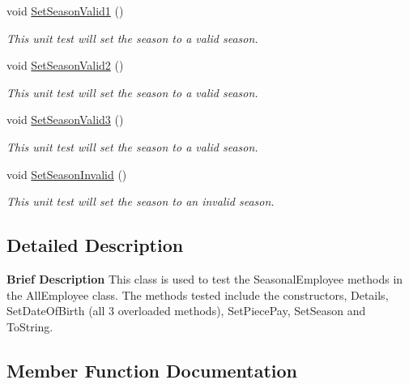 \begin{DoxyCompactItemize}
void \hyperlink{class_my_all_employee_1_1_tests_1_1_seasonal_employee_tests_a72be7ca2a79c9a27833e3551b851a3ff}{Set\+Season\+Valid1} ()
\begin{DoxyCompactList}\small\item\em This unit test will set the season to a valid season. \end{DoxyCompactList}\item 
void \hyperlink{class_my_all_employee_1_1_tests_1_1_seasonal_employee_tests_a425089350805a527c370ea0d0dbc86b8}{Set\+Season\+Valid2} ()
\begin{DoxyCompactList}\small\item\em This unit test will set the season to a valid season. \end{DoxyCompactList}\item 
void \hyperlink{class_my_all_employee_1_1_tests_1_1_seasonal_employee_tests_ac8de2e85a667cbaaccec0f188b47a730}{Set\+Season\+Valid3} ()
\begin{DoxyCompactList}\small\item\em This unit test will set the season to a valid season. \end{DoxyCompactList}\item 
void \hyperlink{class_my_all_employee_1_1_tests_1_1_seasonal_employee_tests_ab03b203538d9d28227f5ae3fcd2d1394}{Set\+Season\+Invalid} ()
\begin{DoxyCompactList}\small\item\em This unit test will set the season to an invalid season. \end{DoxyCompactList}\end{DoxyCompactItemize}


\subsection{Detailed Description}
{\bfseries  Brief Description} This class is used to test the Seasonal\+Employee methods in the All\+Employee class. The methods tested include the constructors, Details, Set\+Date\+Of\+Birth (all 3 overloaded methods), Set\+Piece\+Pay, Set\+Season and To\+String. 

\subsection{Member Function Documentation}
\hypertarget{class_my_all_employee_1_1_tests_1_1_seasonal_employee_tests_add552af166838e9aa1f0c3f2f58b50ae}{}
